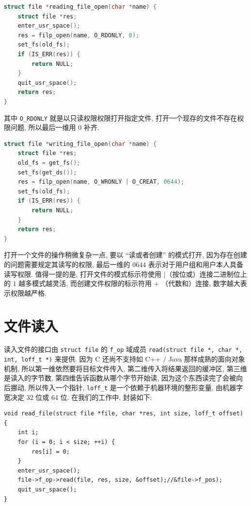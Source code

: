 \documentclass[11pt,fleqn]{book} %
\begin{document}
\vspace*{1.5cm}

\begin{lstlisting}[language=C]
struct file *reading_file_open(char *name) { 
	struct file *res;
	enter_usr_space();
	res = filp_open(name, O_RDONLY, 0);
	set_fs(old_fs);
	if (IS_ERR(res)) {
		return NULL;
	}
	quit_usr_space();
	return res;
}
\end{lstlisting}


\vspace*{0.5cm}

其中 \texttt{O\_RDONLY} 就是以只读权限权限打开指定文件, 打开一个现存的文件不存在权限问题, 所以最后一维用 $0$
补齐. 

\vspace*{0.5cm}

\begin{lstlisting}[language=C]
struct file *writing_file_open(char *name) { 
	struct file *res; 
	old_fs = get_fs(); 
	set_fs(get_ds()); 
	res = filp_open(name, O_WRONLY | O_CREAT, 0644); 
	set_fs(old_fs); 
	if (IS_ERR(res)) { 
		return NULL; 
	} 
	return res; 
}
\end{lstlisting}


\vspace*{0.5cm}

打开一个文件的操作稍微复杂一点, 要以 ``读或者创建'' 的模式打开, 因为存在创建的问题需要规定其读写的权限, 最后一维的 $0644$
表示对于用户组和用户本人具备读写权限. 值得一提的是, 打开文件的模式标示符使用 $\vert$（按位或）连接二进制位上的 $1$
越多模式越灵活, 而创建文件权限的标示符用 $+$ （代数和）连接, 数字越大表示权限越严格. 


\section{文件读入}



读入文件的接口由 \texttt{struct file} 的 \texttt{f\_op} 域成员 \texttt{read(struct
file {*}, char {*}, int, loff\_t {*})} 来提供. 因为 C 还尚不支持如 C++ / Java
那样成熟的面向对象机制, 所以第一维依然要将目标文件传入, 第二维传入将结果返回的缓冲区, 第三维是读入的字节数, 第四维告诉函数从哪个字节开始读,
因为这个东西读完了会被向后挪动, 所以传入一个指针, \texttt{loff\_t} 是一个依赖于机器环境的整形变量, 由机器字宽决定
32 位或 64 位. 在我们的工作中, 封装如下: 

\vspace*{0.5cm}

\begin{lstlisting}
void read_file(struct file *file, char *res, int size, loff_t offset) {
	int i;
	for (i = 0; i < size; ++i) {
		res[i] = 0;
	}
	enter_usr_space();
	file->f_op->read(file, res, size, &offset);//&file->f_pos);
	quit_usr_space();
}
\end{lstlisting}
\end{document}
